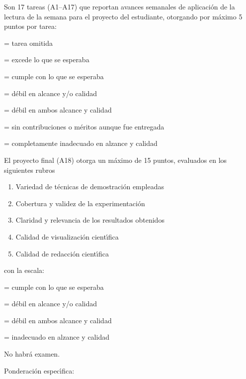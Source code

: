 \documentclass[10 pt]{article}
\begin{document}
  Son 17 tareas (A1--A17) que reportan avances semanales de aplicaci\'{o}n
  de la lectura de la semana para el proyecto del estudiante,
  otorgando por m\'{a}ximo 5 puntos por tarea:
  \begin{description}[itemsep=0em]
  \item[NP]{= tarea omitida}
  \item[5]{= excede lo que se esperaba}
  \item[4]{= cumple con lo que se esperaba}
  \item[3]{= d\'{e}bil en alcance y/o calidad}
  \item[2]{= d\'{e}bil en ambos alcance y calidad}
  \item[1]{= sin contribuciones o m\'{e}ritos aunque fue entregada}
  \item[0]{= completamente inadecuado en alzance y calidad}
  \end{description}
  El proyecto final (A18) otorga un m\'{a}ximo de 15 puntos, evaluados en los
  siguientes rubros
  \begin{enumerate}[itemsep=0em]
  \item{Variedad de t\'{e}cnicas de demostraci\'{o}n empleadas}
  \item{Cobertura y validez de la experimentaci\'{o}n}
  \item{Claridad y relevancia de los resultados obtenidos}    
  \item{Calidad de visualizaci\'{o}n cient\'{\i}fica}
  \item{Calidad de redacci\'{o}n cient\'{\i}fica}
  \end{enumerate}
  con la escala:
  \begin{description}[itemsep=0em]
  \item[3]{= cumple con lo que se esperaba}
  \item[2]{= d\'{e}bil en alcance y/o calidad}
  \item[1]{= d\'{e}bil en ambos alcance y calidad}
  \item[0]{= inadecuado en alzance y calidad}
  \end{description}

  No habr\'{a} examen.

  Ponderaci\'{o}n espec\'{\i}fica:
\end{document}
